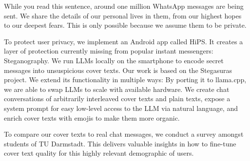 
\begingroup
\let\clearpage\relax
\let\cleardoublepage\relax
\let\cleardoublepage\relax

While you read this sentence, around one million WhatsApp messages are being sent. We share the details of our personal lives in them, from our highest hopes to our deepest fears. This is only possible because we assume them to be private.

To protect user privacy, we implement an Android app called \gls{HiPS}. It creates a layer of protection currently missing from popular instant messengers: Steganography. We run \glspl{LLM} locally on the smartphone to encode secret messages into unsuspicious cover texts. Our work is based on the Stegasuras project. We extend its functionality in multiple ways: By porting it to llama.cpp, we are able to swap \glspl{LLM} to scale with available hardware. We create chat conversations of arbitrarily interleaved cover texts and plain texts, expose a system prompt for easy low-level access to the \gls{LLM} via natural language, and enrich cover texts with emojis to make them more organic.

To compare our cover texts to real chat messages, we conduct a survey amongst students of TU Darmstadt. This delivers valuable insights in how to fine-tune cover text quality for this highly relevant demographic of users.

\vfill

